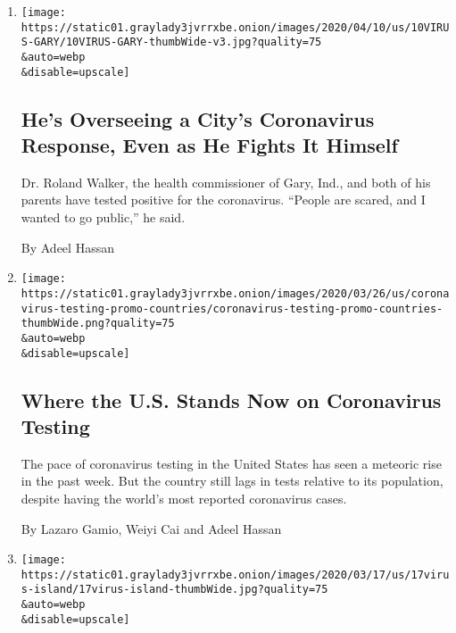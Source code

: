 \begin{enumerate}
\def\labelenumi{\arabic{enumi}.}
\item
  \href{/2020/04/10/us/coronavirus-roland-walker-gary-indiana.html}{}

  \texttt{[image: https://static01.graylady3jvrrxbe.onion/images/2020/04/10/us/10VIRUS-GARY/10VIRUS-GARY-thumbWide-v3.jpg?quality=75\\\&auto=webp\\\&disable=upscale]}

  \hypertarget{hes-overseeing-a-citys-coronavirus-response-even-as-he-fights-it-himself}{%
  \subsection{He's Overseeing a City's Coronavirus Response, Even as He
  Fights It
  Himself}\label{hes-overseeing-a-citys-coronavirus-response-even-as-he-fights-it-himself}}

  Dr. Roland Walker, the health commissioner of Gary, Ind., and both of
  his parents have tested positive for the coronavirus. ``People are
  scared, and I wanted to go public,'' he said.

  By Adeel Hassan
\item
  \href{/interactive/2020/03/26/us/coronavirus-testing-states.html}{}

  \texttt{[image: https://static01.graylady3jvrrxbe.onion/images/2020/03/26/us/coronavirus-testing-promo-countries/coronavirus-testing-promo-countries-thumbWide.png?quality=75\\\&auto=webp\\\&disable=upscale]}

  \hypertarget{where-the-us-stands-now-on-coronavirus-testing}{%
  \subsection{Where the U.S. Stands Now on Coronavirus
  Testing}\label{where-the-us-stands-now-on-coronavirus-testing}}

  The pace of coronavirus testing in the United States has seen a
  meteoric rise in the past week. But the country still lags in tests
  relative to its population, despite having the world's most reported
  coronavirus cases.

  By Lazaro Gamio, Weiyi Cai and Adeel Hassan
\item
  \href{/live/2020/coronavirus-covid-19-03-17/resort-islands-in-the-us-are-barring-outsiders}{}

  \texttt{[image: https://static01.graylady3jvrrxbe.onion/images/2020/03/17/us/17virus-island/17virus-island-thumbWide.jpg?quality=75\\\&auto=webp\\\&disable=upscale]}


\end{enumerate}
